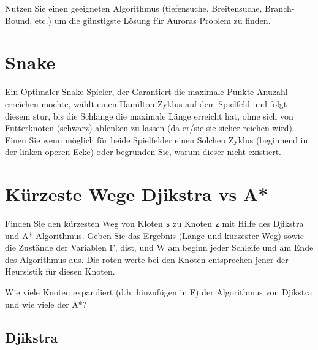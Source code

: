 \documentclass[a4paper,11pt]{report}
\begin{document}
Nutzen Sie einen geeigneten Algorithmus (tiefensuche, Breitensuche, Branch-Bound, etc.) um die günstigste Lösung für Auroras Problem zu finden.

\chapter{Snake}

Ein Optimaler Snake-Spieler, der Garantiert die maximale Punkte Anuzahl erreichen möchte, wählt einen Hamilton Zyklus auf dem Spielfeld und folgt diesem stur, bis die Schlange die maximale Länge erreicht hat, ohne sich von Futterknoten (schwarz) ablenken zu lassen (da er/sie sie sicher reichen wird).
Finen Sie wenn möglich für beide Spielfelder einen Solchen Zyklus (beginnend in der linken operen Ecke) oder begründen Sie, warum dieser nicht existiert.

\newpage

\chapter{Kürzeste Wege Djikstra vs A*}

Finden Sie den kürzesten Weg von Kloten \texttt{s} zu Knoten \texttt{z} mit Hilfe des Djikstra und A* Algorithmus.
Geben Sie das Ergebnis (Länge und kürzester Weg) sowie die Zustände der Variablen F, dist, und W am beginn jeder Schleife und am Ende des Algorithmus aus.
Die roten werte bei den Knoten entsprechen jener der Heursistik für diesen Knoten.

Wie viele Knoten expandiert (d.h. hinzufügen in F) der Algorithmus von Djikstra und wie viele der A*?

\section{Djikstra}\label{sec:djikstra}
\end{document}
